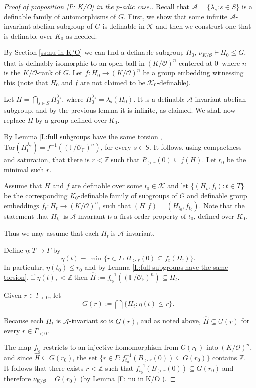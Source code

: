 \documentclass[11pt]{amsart}
\theoremstyle{definition}
\newcommand{\CA}{\mathcal A}
\newcommand{\CK}{{\mathcal K}}
\newcommand{\CO}{{\mathcal O}}
\newcommand{\0}{\emptyset}
\def\sub{\subseteq}
\begin{document}
\begin{proof}[Proof of proposition \ref{P: K/O} in the $p$-adic case.] Recall that $\CA=\{\lambda_s:s\in S\}$ is a definable family of automorphisms of $G$.
  First, we show that some infinite $\CA$-invariant abelian subgroup of $G$ is definable in $\CK$ and then we construct one that is definable over $K_0$ as needed.
  
  By Section \ref{ss:nu in K/O} we can find a definable subgroup $H_0$,  $\nu_{K/\CO}\vdash  H_0\leq G$,  that is definably isomorphic to  an open ball in $(K/\CO)^n$ centered at $0$, where $n$ is the $K/\CO$-rank of $G$. Let $f:H_0\to (K/\CO)^n$ be a group embedding witnessing this (note that $H_0$ and $f$ are not claimed to be $\CK_0$-definable).
  
  Let $H=\bigcap\limits_{s\in S} H_0^{\lambda_s}$, where $H_0^{\lambda_s}=\lambda_s(H_0)$. It is a definable $\CA$-invariant abelian subgroup, and by the previous lemma it is infinite, as claimed. We shall now replace $H$ by a group defined over $K_0$.
  
  
  By Lemma \ref{L:full subgroups have the same torsion}, $\mathrm{Tor}(H_0^{\lambda_s})=f^{-1}((\mathbb F/\CO_{\mathbb F})^n)$, for every $s\in S$.  It follows, using compactness and saturation, that there is   $r<\mathbb{Z}$ such that $B_{>r}(0)\sub f(H)$. Let $r_0$ be the minimal such $r$.
  
  Assume that $H$ and $f$ are definable over some $t_0\in \CK$ and let $\{(H_t,f_t):t\in T\}$ be the corresponding $K_0$-definable family of subgroups of $G$ and definable group embeddings $f_t:H_t\to (K/\CO)^n$, such that $(H,f)= (H_{t_0},f_{t_0})$.
Note that the statement that $H_{t_0}$ is $\CA$-invariant is a first order property of $t_0$, defined over $K_0$. 

 Thus we may assume that  each $H_t$ is $\CA$-invariant. 
 
 Define $\eta:T\to \Gamma$  by $$\eta(t)=\min\{r\in \Gamma:B_{>r}(0)\sub f_t(H_t)\}.$$ In particular, $\eta(t_0)\leq r_0$ and by Lemma \ref{L:full subgroups have the same torsion}, if $\eta(t), <\mathbb{Z}$ then $\hat H:=f_{t_0}^{-1}((\mathbb F/\CO_{\mathbb F})^n)\sub H_t.$

 
  Given  $r \in \Gamma_{<0}$, let 
  \[
    G(r):=\bigcap \{H_t:\eta(t)\leq r\}.
   \] 
     
 Because each $H_t$ is $\CA$-invariant so is $G(r)$, and as noted above,  $\hat H\sub G(r)$ for every $r\in \Gamma_{<0}$.
 

 The map $f_{t_0}$ restricts to an injective homomorphism from $G(r_0)$ into $(K/\CO)^n$, and since $\hat H\sub G(r_0)$, the  set $\{r\in \Gamma: f_{t_0}^{-1}(B_{>r}(0))\sub G(r_0)\}$  contains $\mathbb Z$. It follows that  there exists $r<\mathbb Z$ such that $f_{t_0}^{-1}(B_{>r}(0))\sub G(r_0) $ 
 and therefore   $\nu_{K/\CO}\vdash G(r_0)$ (by Lemma \ref{F: nu in K/O}). 




\end{proof}
\end{document}
